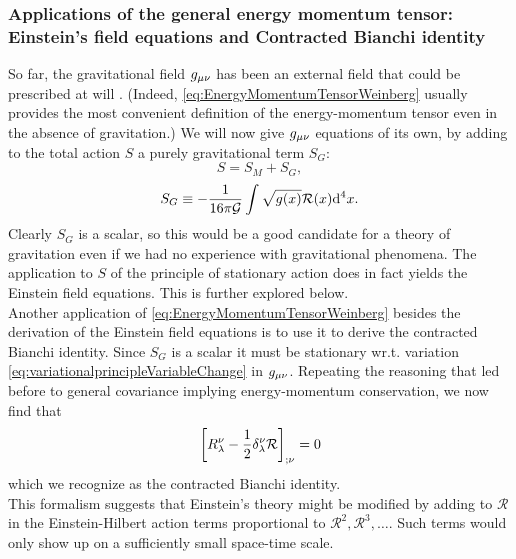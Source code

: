 \subsubsection{Applications of the general energy momentum tensor: Einstein's field equations and Contracted Bianchi identity}
So far, the gravitational field $g_{\mu \nu}$ has been an external field that could be prescribed at will . (Indeed, \ref{eq:EnergyMomentumTensorWeinberg} usually provides the most convenient definition of the energy-momentum tensor even in the absence of gravitation.) We will now give $g_{\mu \nu}$ equations of its own, by adding to the total action $S$ a purely gravitational term $S_G$:
\begin{equation}
	S=S_M+S_G,
\end{equation}
\begin{equation}
	S_G \equiv - \frac{1}{16 \pi \mathcal{G}} \int \sqrt{g(x)} \mathcal{R}(x) \mathrm{d}^4 x.
\end{equation}
Clearly $S_G$ is a scalar, so this would be a good candidate for a theory of gravitation even if we had no experience with gravitational phenomena. The application to $S$ of the principle of stationary action does in fact yields the Einstein field equations. This is further explored below.\\
Another application of \ref{eq:EnergyMomentumTensorWeinberg} besides the derivation of the Einstein field equations is to use it to derive the contracted Bianchi identity. Since $S_G$ is a scalar it must be stationary wr.t. variation \ref{eq:variationalprincipleVariableChange} in $g_{\mu \nu}$. Repeating the reasoning that led before to general covariance implying energy-momentum conservation, we now find that
\begin{equation}
	\left[R^\nu_\lambda - \frac{1}{2} \delta^\nu_\lambda \mathcal{R}\right]_{;\nu} = 0
\end{equation}
which we recognize as the contracted Bianchi identity.\\
This formalism suggests that Einstein's theory might be modified by adding to $\mathcal{R}$ in the Einstein-Hilbert action terms proportional to $\mathcal{R}^2,\mathcal{R}^3,\dots$. Such terms would only show up on a sufficiently small space-time scale.

















